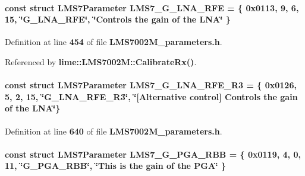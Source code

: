 \paragraph[{L\+M\+S7\+\_\+\+G\+\_\+\+L\+N\+A\+\_\+\+R\+FE}]{\setlength{\rightskip}{0pt plus 5cm}const struct {\bf L\+M\+S7\+Parameter} L\+M\+S7\+\_\+\+G\+\_\+\+L\+N\+A\+\_\+\+R\+FE = \{ 0x0113, 9, 6, 15, \char`\"{}\+G\+\_\+\+L\+N\+A\+\_\+\+R\+F\+E\char`\"{}, \char`\"{}\+Controls the gain of the L\+N\+A\char`\"{} \}\hspace{0.3cm}{\ttfamily [static]}}\label{LMS7002M__parameters_8h_ac40ba974f70bc543ed2c4d2cfbc2c92e}


Definition at line {\bf 454} of file {\bf L\+M\+S7002\+M\+\_\+parameters.\+h}.



Referenced by {\bf lime\+::\+L\+M\+S7002\+M\+::\+Calibrate\+Rx()}.

\paragraph[{L\+M\+S7\+\_\+\+G\+\_\+\+L\+N\+A\+\_\+\+R\+F\+E\+\_\+\+R3}]{\setlength{\rightskip}{0pt plus 5cm}const struct {\bf L\+M\+S7\+Parameter} L\+M\+S7\+\_\+\+G\+\_\+\+L\+N\+A\+\_\+\+R\+F\+E\+\_\+\+R3 = \{ 0x0126, 5, 2, 15, \char`\"{}\+G\+\_\+\+L\+N\+A\+\_\+\+R\+F\+E\+\_\+\+R3\char`\"{}, \char`\"{}[\+Alternative control] Controls the gain of the L\+N\+A\char`\"{}\}\hspace{0.3cm}{\ttfamily [static]}}\label{LMS7002M__parameters_8h_a2186a3d48c6acb1c13624f0f218dcb57}


Definition at line {\bf 640} of file {\bf L\+M\+S7002\+M\+\_\+parameters.\+h}.

\paragraph[{L\+M\+S7\+\_\+\+G\+\_\+\+P\+G\+A\+\_\+\+R\+BB}]{\setlength{\rightskip}{0pt plus 5cm}const struct {\bf L\+M\+S7\+Parameter} L\+M\+S7\+\_\+\+G\+\_\+\+P\+G\+A\+\_\+\+R\+BB = \{ 0x0119, 4, 0, 11, \char`\"{}\+G\+\_\+\+P\+G\+A\+\_\+\+R\+B\+B\char`\"{}, \char`\"{}\+This is the gain of the P\+G\+A\char`\"{} \}\hspace{0.3cm}{\ttfamily [static]}}\label{LMS7002M__parameters_8h_a198c6992ba85e002cc6438ec4355dcb2}


